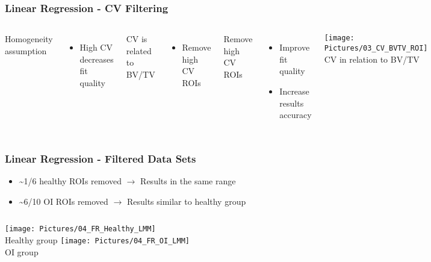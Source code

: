 \documentclass[xcolor=table,11pt]{beamer}
\begin{document}
\begin{frame}
	\frametitle{Linear Regression - CV Filtering}
	\fontsize{10pt}{10pt}\selectfont
	\begin{columns}
		Homogeneity assumption
		\begin{itemize}
			\item High CV decreases fit quality
		\end{itemize}
	
		\vspace{10pt}
		
		CV is related to BV/TV
		\begin{itemize}
			\item Remove high CV ROIs
		\end{itemize}
	
		\vspace{10pt}
		
		Remove high CV ROIs
		\begin{itemize}
			\item Improve fit quality
			\item Increase results accuracy
		\end{itemize}
		
		
		\centering
		\texttt{[image: Pictures/03\_CV\_BVTV\_ROI]}\\
		CV in relation to BV/TV
	\end{columns}	
\end{frame}



\begin{frame}
	\frametitle{Linear Regression - Filtered Data Sets}
	\begin{itemize}
		\item \textasciitilde 1/6 healthy ROIs removed $\rightarrow$ Results in the same range
		\item \textasciitilde 6/10 OI ROIs removed \hspace{0.52cm}$\rightarrow$ Results similar to healthy group
	\end{itemize}
	\begin{columns}
		\column{0.5\textwidth}
		\centering
		\texttt{[image: Pictures/04\_FR\_Healthy\_LMM]}\\
		Healthy group
		\column{0.5\textwidth}
		\centering
		\texttt{[image: Pictures/04\_FR\_OI\_LMM]}\\
		OI group
	\end{columns}	
\end{frame}
\end{document}
